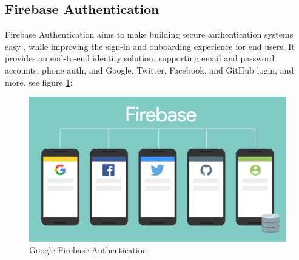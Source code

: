 \subsection{Firebase Authentication}
Firebase Authentication aims to make building secure authentication systems easy \cite{3}, while improving the sign-in and onboarding experience for end users. It provides an end-to-end identity solution, supporting email and password accounts, phone auth, and Google, Twitter, Facebook, and GitHub login, and more. see figure \ref{fig:5.5 cubed graph}:
\begin{figure}[h]
	\centering
	\includegraphics[scale=0.2]{img/firebaseauth.png}
	\caption{Google Firebase Authentication}
	\label{fig:5.5 cubed graph}
\end{figure}
